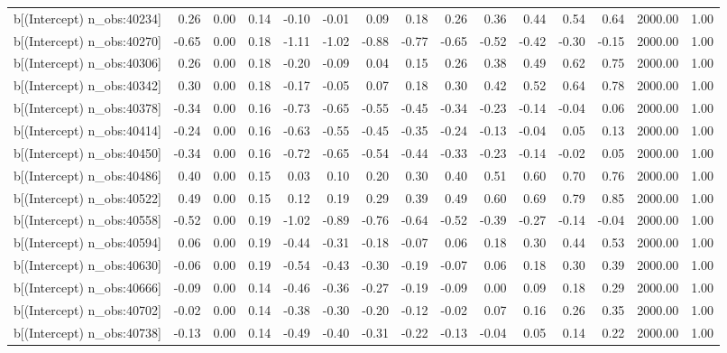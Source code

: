 \begin{table}[ht]
\begin{tabular}{rrrrrrrrrrrrrrr}
  b[(Intercept) n\_obs:40234] & 0.26 & 0.00 & 0.14 & -0.10 & -0.01 & 0.09 & 0.18 & 0.26 & 0.36 & 0.44 & 0.54 & 0.64 & 2000.00 & 1.00 \\ 
  b[(Intercept) n\_obs:40270] & -0.65 & 0.00 & 0.18 & -1.11 & -1.02 & -0.88 & -0.77 & -0.65 & -0.52 & -0.42 & -0.30 & -0.15 & 2000.00 & 1.00 \\ 
  b[(Intercept) n\_obs:40306] & 0.26 & 0.00 & 0.18 & -0.20 & -0.09 & 0.04 & 0.15 & 0.26 & 0.38 & 0.49 & 0.62 & 0.75 & 2000.00 & 1.00 \\ 
  b[(Intercept) n\_obs:40342] & 0.30 & 0.00 & 0.18 & -0.17 & -0.05 & 0.07 & 0.18 & 0.30 & 0.42 & 0.52 & 0.64 & 0.78 & 2000.00 & 1.00 \\ 
  b[(Intercept) n\_obs:40378] & -0.34 & 0.00 & 0.16 & -0.73 & -0.65 & -0.55 & -0.45 & -0.34 & -0.23 & -0.14 & -0.04 & 0.06 & 2000.00 & 1.00 \\ 
  b[(Intercept) n\_obs:40414] & -0.24 & 0.00 & 0.16 & -0.63 & -0.55 & -0.45 & -0.35 & -0.24 & -0.13 & -0.04 & 0.05 & 0.13 & 2000.00 & 1.00 \\ 
  b[(Intercept) n\_obs:40450] & -0.34 & 0.00 & 0.16 & -0.72 & -0.65 & -0.54 & -0.44 & -0.33 & -0.23 & -0.14 & -0.02 & 0.05 & 2000.00 & 1.00 \\ 
  b[(Intercept) n\_obs:40486] & 0.40 & 0.00 & 0.15 & 0.03 & 0.10 & 0.20 & 0.30 & 0.40 & 0.51 & 0.60 & 0.70 & 0.76 & 2000.00 & 1.00 \\ 
  b[(Intercept) n\_obs:40522] & 0.49 & 0.00 & 0.15 & 0.12 & 0.19 & 0.29 & 0.39 & 0.49 & 0.60 & 0.69 & 0.79 & 0.85 & 2000.00 & 1.00 \\ 
  b[(Intercept) n\_obs:40558] & -0.52 & 0.00 & 0.19 & -1.02 & -0.89 & -0.76 & -0.64 & -0.52 & -0.39 & -0.27 & -0.14 & -0.04 & 2000.00 & 1.00 \\ 
  b[(Intercept) n\_obs:40594] & 0.06 & 0.00 & 0.19 & -0.44 & -0.31 & -0.18 & -0.07 & 0.06 & 0.18 & 0.30 & 0.44 & 0.53 & 2000.00 & 1.00 \\ 
  b[(Intercept) n\_obs:40630] & -0.06 & 0.00 & 0.19 & -0.54 & -0.43 & -0.30 & -0.19 & -0.07 & 0.06 & 0.18 & 0.30 & 0.39 & 2000.00 & 1.00 \\ 
  b[(Intercept) n\_obs:40666] & -0.09 & 0.00 & 0.14 & -0.46 & -0.36 & -0.27 & -0.19 & -0.09 & 0.00 & 0.09 & 0.18 & 0.29 & 2000.00 & 1.00 \\ 
  b[(Intercept) n\_obs:40702] & -0.02 & 0.00 & 0.14 & -0.38 & -0.30 & -0.20 & -0.12 & -0.02 & 0.07 & 0.16 & 0.26 & 0.35 & 2000.00 & 1.00 \\ 
  b[(Intercept) n\_obs:40738] & -0.13 & 0.00 & 0.14 & -0.49 & -0.40 & -0.31 & -0.22 & -0.13 & -0.04 & 0.05 & 0.14 & 0.22 & 2000.00 & 1.00 \\ 

\end{tabular}
\end{table}
